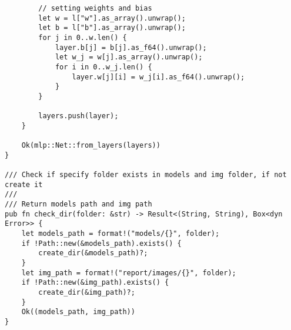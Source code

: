 \begin{code}
\begin{verbatim}
        // setting weights and bias
        let w = l["w"].as_array().unwrap();
        let b = l["b"].as_array().unwrap();
        for j in 0..w.len() {
            layer.b[j] = b[j].as_f64().unwrap();
            let w_j = w[j].as_array().unwrap();
            for i in 0..w_j.len() {
                layer.w[j][i] = w_j[i].as_f64().unwrap();
            }
        }

        layers.push(layer);
    }

    Ok(mlp::Net::from_layers(layers))
}

/// Check if specify folder exists in models and img folder, if not create it
///
/// Return models path and img path
pub fn check_dir(folder: &str) -> Result<(String, String), Box<dyn Error>> {
    let models_path = format!("models/{}", folder);
    if !Path::new(&models_path).exists() {
        create_dir(&models_path)?;
    }
    let img_path = format!("report/images/{}", folder);
    if !Path::new(&img_path).exists() {
        create_dir(&img_path)?;
    }
    Ok((models_path, img_path))
}

\end{verbatim}
\end{code}